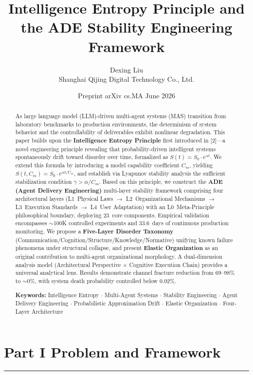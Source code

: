 \documentclass[11pt,a4paper]{article}
\title{Intelligence Entropy Principle and the ADE Stability Engineering Framework}
\author{Dexing Liu\\
Shanghai Qijing Digital Technology Co., Ltd.}
\date{Preprint \quad arXiv cs.MA \quad June 2026}
\begin{document}
\maketitle

\begin{abstract}
As large language model (LLM)-driven multi-agent systems (MAS) transition from laboratory benchmarks to production environments, the determinism of system behavior and the controllability of deliverables exhibit nonlinear degradation. This paper builds upon the \textbf{Intelligence Entropy Principle} first introduced in [2]---a novel engineering principle revealing that probability-driven intelligent systems spontaneously drift toward disorder over time, formalized as $S(t) = S_0 \cdot e^{\alpha t}$. We extend this formula by introducing a model capability coefficient $C_m$, yielding $S(t, C_m) = S_0 \cdot e^{\alpha t/C_m}$, and establish via Lyapunov stability analysis the sufficient stabilization condition $\gamma > \alpha/C_m$. Based on this principle, we construct the \textbf{ADE (Agent Delivery Engineering)} multi-layer stability framework comprising four architectural layers (L1~Physical Laws $\rightarrow$ L2~Organizational Mechanisms $\rightarrow$ L3~Execution Standards $\rightarrow$ L4~User Adaptation) with an L0~Meta-Principle philosophical boundary, deploying 23~core components. Empirical validation encompasses $\sim$100K controlled experiments and 33.6~days of continuous production monitoring. We propose a \textbf{Five-Layer Disorder Taxonomy} (Communication/Cognition/Structure/Knowledge/Normative) unifying known failure phenomena under structural collapse, and present \textbf{Elastic Organization} as an original contribution to multi-agent organizational morphology. A dual-dimension analysis model (Architectural Perspective $\times$ Cognitive Execution Chain) provides a universal analytical lens. Results demonstrate channel fracture reduction from 69--98\% to $\sim$0\%, with system death probability controlled below 0.02\%.

\medskip
\noindent\textbf{Keywords:} Intelligence Entropy $\cdot$ Multi-Agent Systems $\cdot$ Stability Engineering $\cdot$ Agent Delivery Engineering $\cdot$ Probabilistic Approximation Drift $\cdot$ Elastic Organization $\cdot$ Four-Layer Architecture
\end{abstract}

\section*{Part I \quad Problem and Framework}
\vspace{-0.5em}
\hrule
\medskip
\end{document}
